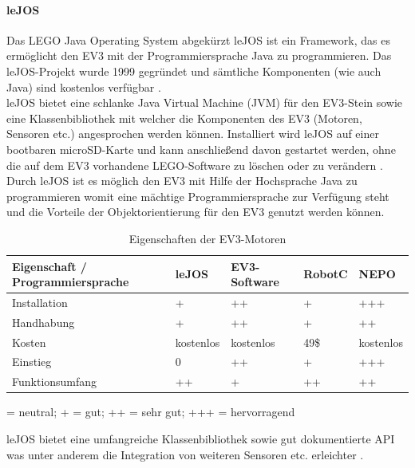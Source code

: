 \paragraph{leJOS}
Das LEGO Java Operating System abgekürzt leJOS ist ein Framework, das es ermöglicht den EV3 mit der Programmiersprache Java zu programmieren. Das leJOS-Projekt wurde 1999 gegründet und sämtliche Komponenten (wie auch Java) sind kostenlos verfügbar \cite[vgl.][21 f.]{Schobel.RobertaEV3Programmieren}. \\
leJOS bietet eine schlanke Java Virtual Machine (JVM) für den EV3-Stein sowie eine Klassenbibliothek mit welcher die Komponenten des EV3 (Motoren, Sensoren etc.) angesprochen werden können. Installiert wird leJOS auf einer bootbaren microSD-Karte und kann anschließend davon gestartet werden, ohne die auf dem EV3 vorhandene LEGO-Software zu löschen oder zu verändern \cite[vgl.][23 f.]{Schobel.RobertaEV3Programmieren}. \\
Durch leJOS ist es möglich den EV3 mit Hilfe der Hochsprache Java zu programmieren womit eine mächtige
Programmiersprache zur Verfügung steht und die Vorteile der Objektorientierung für den EV3 genutzt werden können.
\begin{table}[ht]
	\begin{tabular}{|p{}|p{}|p{}|p{}|p{}|} \hline
		Eigenschaft / Programmiersprache  & leJOS      & EV3-Software  & RobotC  & NEPO       \\ \hline
		Installation                      & +          & ++            & +       & +++        \\ \hline
		Handhabung    		           	  & +          & ++            & +       & ++         \\ \hline
		Kosten                            & kostenlos  & kostenlos     & 49\$    & kostenlos  \\ \hline
		Einstieg 	                      & 0          & ++            & +       & +++        \\ \hline  
		Funktionsumfang    				  & ++         & +             & ++      & ++         \\ \hline
	\end{tabular}
	\centering
	 = neutral; + = gut; ++ = sehr gut; +++ = hervorragend
	\caption[Eigenschaften der EV3-Motortypen]{Eigenschaften der EV3-Motoren}
\end{table}
leJOS bietet eine umfangreiche Klassenbibliothek sowie gut dokumentierte API was unter anderem die
Integration von weiteren Sensoren etc. erleichter \cite[vgl.][23 f.]{Schobel.RobertaEV3Programmieren}.
